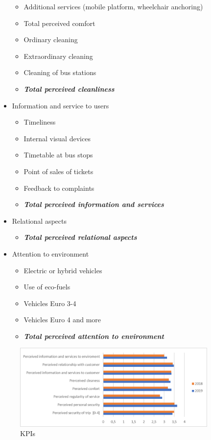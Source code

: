 \begin{itemize}
\begin{itemize}
        \item Additional services (mobile platform, wheelchair anchoring)
        \item Total perceived comfort
        \item Ordinary cleaning
        \item Extraordinary cleaning
        \item Cleaning of bus stations
        \item \textit{\textbf{Total perceived cleanliness}}
    \end{itemize}
    \item Information and service to users
    \begin{itemize}
        \item Timeliness
        \item Internal visual devices
        \item Timetable at bus stops
        \item Point of sales of tickets
        \item Feedback to complaints
        \item \textit{\textbf{Total perceived information and services}}
    \end{itemize}
    \item Relational aspects
        \begin{itemize}
            \item  \textit{\textbf{Total perceived relational aspects}}
        \end{itemize}
    \item Attention to environment
        \begin{itemize}
            \item Electric or hybrid vehicles 
            \item Use of eco-fuels
            \item Vehicles Euro 3-4
            \item Vehicles Euro 4 and more
            \item \textit{\textbf{Total perceived attention to environment}}
        \end{itemize}
\end{itemize}

\begin{figure}[h!]
    \centering
    \includegraphics[width=0.9\textwidth]{Images/Social_sustainability/graph.png}
    \caption{KPIs}
    \label{fig:kpis}
\end{figure}

